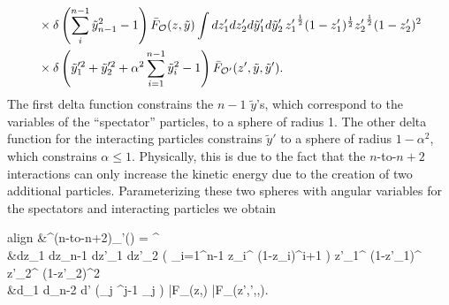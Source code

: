 {\begin{equation}
\begin{aligned}
			&\times \delta\left(\sum_i^{n-1} \tilde{y}^2_{n-1} -1  \right) \bar{F}_{{\cal O}}(z,\tilde{y}) \int dz'_1 dz'_2  d\tilde{y}'_1 d\tilde{y}_2'\, {z'_1}^{\frac{1}{2}} (1-z'_1)^{\frac{1}{2}} {z'_2}^{\frac{1}{2}} (1-z'_2)^2 \\
			&\times \delta\left(\tilde{y}_1^{\prime 2} + \tilde{y}_2^{\prime 2} + \alpha^2 \sum_{i=1}^{n-1} \tilde{y}_i^2 - 1 \right) \bar{F}_{{\cal O}'}(z', \tilde{y},\tilde{y}').
		\end{aligned}
	\end{equation} The first delta function constrains the $n-1$ $\tilde{y}$'s, which correspond to the variables of the ``spectator'' particles, to a sphere of radius 1. The other delta function for the interacting particles constrains $\tilde{y}'$ to a sphere of radius $1-\alpha^2$, which constrains $\alpha \le 1$. Physically, this is due to the fact that the $n$-to-$n+2$ interactions can only increase the kinetic energy due to the creation of two additional particles. Parameterizing these two spheres with angular variables for the spectators and interacting particles we obtain \begin{empheq}[box=\fbox]{align}
			&\Mcal^{(n\textrm{-to-}n+2)}_{\Ocal \Ocal'}(\alpha) =   \alpha^{}  \nonumber \\
			&\times \int dz_1 \dotsb dz_{n-1} dz'_1 dz'_2   \left( \prod_{i=1}^{n-1} z_i^{} (1-z_i)^{i+1} \right) {z'_1}^{} (1-z'_1)^{} {z'_2}^{} (1-z'_2)^2 \nonumber \\
			&\times \int d\theta_1 \dotsb d\theta_{n-2} d\theta' \left(\prod_j \sin^{j-1} \theta_j \right) \bar{F}_{\Ocal}(z,\theta) \bar{F}_{\Ocal}(z',\theta',\theta,\alpha).
		\end{empheq}

}
